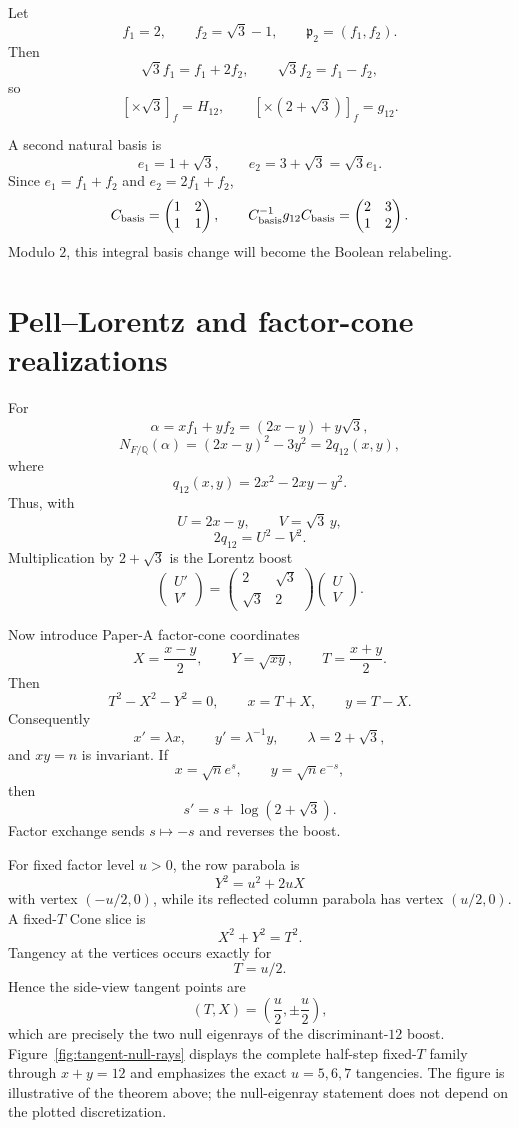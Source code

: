 \documentclass[11pt]{article}
\theoremstyle{remark}
\newcommand{\Q}{\mathbb Q}
\begin{document}
Let
\[
f_1=2,
\qquad f_2=\sqrt3-1,
\qquad \mathfrak p_2=(f_1,f_2).
\]
Then
\[
\sqrt3 f_1=f_1+2f_2,
\qquad
\sqrt3 f_2=f_1-f_2,
\]
so
\[
[\times\sqrt3]_f=H_{12},
\qquad
[\times(2+\sqrt3)]_f=g_{12}.
\]

A second natural basis is
\[
e_1=1+\sqrt3,
\qquad e_2=3+\sqrt3=\sqrt3 e_1.
\]
Since $e_1=f_1+f_2$ and $e_2=2f_1+f_2$,
\[
C_{\rm basis}=\begin{pmatrix}1&2\\1&1\end{pmatrix},
\qquad
C_{\rm basis}^{-1}g_{12}C_{\rm basis}
=\begin{pmatrix}2&3\\1&2\end{pmatrix}.
\]
Modulo $2$, this integral basis change will become the Boolean relabeling.

\section{Pell--Lorentz and factor-cone realizations}

For
\[
\alpha=xf_1+yf_2=(2x-y)+y\sqrt3,
\]
\[
N_{F/\Q}(\alpha)
=(2x-y)^2-3y^2
=2q_{12}(x,y),
\]
where
\[
q_{12}(x,y)=2x^2-2xy-y^2.
\]
Thus, with
\[
U=2x-y,
\qquad V=\sqrt3\,y,
\]
\[
2q_{12}=U^2-V^2.
\]
Multiplication by $2+\sqrt3$ is the Lorentz boost
\[
\begin{pmatrix}U'\\V'\end{pmatrix}
=
\begin{pmatrix}2&\sqrt3\\\sqrt3&2\end{pmatrix}
\begin{pmatrix}U\\V\end{pmatrix}.
\]

Now introduce Paper-A factor-cone coordinates
\[
X=\frac{x-y}{2},
\qquad Y=\sqrt{xy},
\qquad T=\frac{x+y}{2}.
\]
Then
\[
T^2-X^2-Y^2=0,
\qquad x=T+X,
\qquad y=T-X.
\]
Consequently
\[
\boxed{x'=\lambda x,\qquad y'=\lambda^{-1}y,}
\qquad \lambda=2+\sqrt3,
\]
and $xy=n$ is invariant.  If
\[
x=\sqrt n e^s,
\qquad y=\sqrt n e^{-s},
\]
then
\[
\boxed{s'=s+\log(2+\sqrt3).}
\]
Factor exchange sends $s\mapsto-s$ and reverses the boost.

For fixed factor level $u>0$, the row parabola is
\[
Y^2=u^2+2uX
\]
with vertex $(-u/2,0)$, while its reflected column parabola has vertex
$(u/2,0)$.  A fixed-$T$ Cone slice is
\[
X^2+Y^2=T^2.
\]
Tangency at the vertices occurs exactly for
\[
T=u/2.
\]
Hence the side-view tangent points are
\[
(T,X)=\left(\frac u2,\pm\frac u2\right),
\]
which are precisely the two null eigenrays of the discriminant-$12$ boost.
Figure~\ref{fig:tangent-null-rays} displays the complete half-step fixed-$T$
family through $x+y=12$ and emphasizes the exact $u=5,6,7$ tangencies.  The
figure is illustrative of the theorem above; the null-eigenray statement does
not depend on the plotted discretization.
\end{document}
